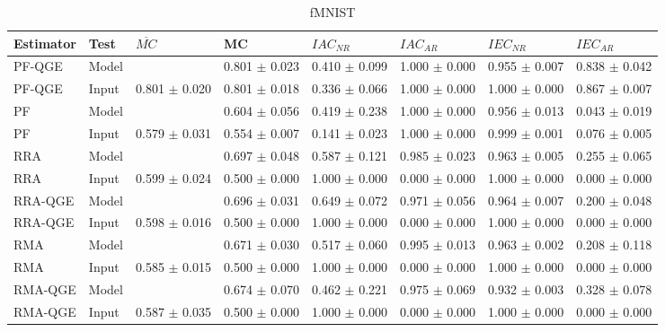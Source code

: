 \newpage

\begin{table}
\caption{fMNIST}
\label{table-meta-eval-fMNIST}
\begin{tabular}{llllllll}
\toprule
Estimator & Test & $\overline{MC}$ & MC & $IAC_{NR}$ & $IAC_{AR}$ & $IEC_{NR}$ & $IEC_{AR}$ \\
\midrule
PF-QGE & Model &  & 0.801 $\pm$ 0.023 & 0.410 $\pm$ 0.099 & 1.000 $\pm$ 0.000 & 0.955 $\pm$ 0.007 & 0.838 $\pm$ 0.042 \\
PF-QGE & Input & 0.801 $\pm$ 0.020 & 0.801 $\pm$ 0.018 & 0.336 $\pm$ 0.066 & 1.000 $\pm$ 0.000 & 1.000 $\pm$ 0.000 & 0.867 $\pm$ 0.007 \\
PF & Model &  & 0.604 $\pm$ 0.056 & 0.419 $\pm$ 0.238 & 1.000 $\pm$ 0.000 & 0.956 $\pm$ 0.013 & 0.043 $\pm$ 0.019 \\
PF & Input & 0.579 $\pm$ 0.031 & 0.554 $\pm$ 0.007 & 0.141 $\pm$ 0.023 & 1.000 $\pm$ 0.000 & 0.999 $\pm$ 0.001 & 0.076 $\pm$ 0.005 \\
RRA & Model &  & 0.697 $\pm$ 0.048 & 0.587 $\pm$ 0.121 & 0.985 $\pm$ 0.023 & 0.963 $\pm$ 0.005 & 0.255 $\pm$ 0.065 \\
RRA & Input & 0.599 $\pm$ 0.024 & 0.500 $\pm$ 0.000 & 1.000 $\pm$ 0.000 & 0.000 $\pm$ 0.000 & 1.000 $\pm$ 0.000 & 0.000 $\pm$ 0.000 \\
RRA-QGE & Model &  & 0.696 $\pm$ 0.031 & 0.649 $\pm$ 0.072 & 0.971 $\pm$ 0.056 & 0.964 $\pm$ 0.007 & 0.200 $\pm$ 0.048 \\
RRA-QGE & Input & 0.598 $\pm$ 0.016 & 0.500 $\pm$ 0.000 & 1.000 $\pm$ 0.000 & 0.000 $\pm$ 0.000 & 1.000 $\pm$ 0.000 & 0.000 $\pm$ 0.000 \\
RMA & Model &  & 0.671 $\pm$ 0.030 & 0.517 $\pm$ 0.060 & 0.995 $\pm$ 0.013 & 0.963 $\pm$ 0.002 & 0.208 $\pm$ 0.118 \\
RMA & Input & 0.585 $\pm$ 0.015 & 0.500 $\pm$ 0.000 & 1.000 $\pm$ 0.000 & 0.000 $\pm$ 0.000 & 1.000 $\pm$ 0.000 & 0.000 $\pm$ 0.000 \\
RMA-QGE & Model &  & 0.674 $\pm$ 0.070 & 0.462 $\pm$ 0.221 & 0.975 $\pm$ 0.069 & 0.932 $\pm$ 0.003 & 0.328 $\pm$ 0.078 \\
RMA-QGE & Input & 0.587 $\pm$ 0.035 & 0.500 $\pm$ 0.000 & 1.000 $\pm$ 0.000 & 0.000 $\pm$ 0.000 & 1.000 $\pm$ 0.000 & 0.000 $\pm$ 0.000 \\
\bottomrule
\end{tabular}
\end{table}

